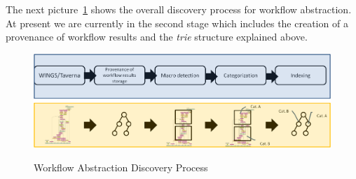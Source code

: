 The next picture~\ref{fig:workflowAbstraction} shows the overall discovery process for workflow abstraction. At present we are currently in the second stage which includes the creation of a provenance of workflow results and the \textit{trie} structure explained above. 

\begin{figure}
\begin{center}
\label{fig:workflowAbstraction}
\includegraphics[scale=0.5]{workflowAbstraction}
\caption{Workflow Abstraction Discovery Process}
\end{center}
\end{figure}